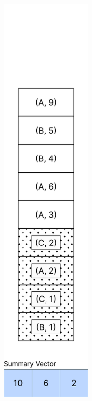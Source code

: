 \documentclass[]             %
{NASA}                       %
\theoremstyle{definition}
\begin{document}
\begin{figure}
  \begin{subfigure}{0.5\textwidth}
    \centering
    \includegraphics[width=0.5\textwidth]{images/conit/Order1.png}

\end{subfigure}
\end{figure}
\end{document}

